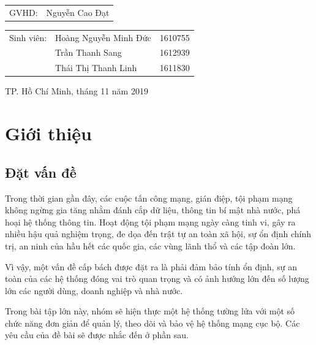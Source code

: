 \documentclass[12pt,titlepage,a4paper]{article}
\begin{document}
\begin{titlepage}
		\begin{table}[h]
			\begin{tabular}{ll}
				\hspace{2.75cm} GVHD: & Nguyễn Cao Đạt\\
			\end{tabular}
		\end{table}
		\begin{table}[h]
			\hspace{2.75cm} 
			\begin{tabular}{lll}
				Sinh viên: & Hoàng Nguyễn Minh Đức & 1610755
				\\
				 & Trần Thanh Sang & 1612939
				 \\
				 & Thái Thị Thanh Linh & 1611830
			\end{tabular}
		\end{table}
		
		\vspace{5cm}
		\begin{center}
			{\footnotesize TP. Hồ Chí Minh, tháng 11 năm 2019 }
		\end{center}
	\end{titlepage}
	
	\newpage
	\thispagestyle{empty}
	\tableofcontents
	
	\newpage
	\section{Giới thiệu}
	\subsection{Đặt vấn đề}
	Trong thời gian gần đây, các cuộc tấn công mạng, gián điệp, tội phạm mạng không ngừng gia tăng nhằm đánh cắp dữ liệu, thông tin bí mật nhà nước, phá hoại hệ thống thông tin. Hoạt động tội phạm mạng ngày càng tinh vi, gây ra nhiều hậu quả nghiệm trọng, đe dọa đến trật tự an toàn xã hội, sự ổn định chính trị, an ninh của hầu hết các quốc gia, các vùng lãnh thổ và các tập đoàn lớn.
	\par
	Vì vậy, một vấn đề cấp bách được đặt ra là phải đảm bảo tính ổn định, sự an toàn của các hệ thống đóng vai trò quan trọng và có ảnh hướng lớn đến số lượng lớn các người dùng, doanh nghiệp và nhà nước.
	\par
	Trong bài tập lớn này, nhóm sẽ hiện thực một hệ thống tường lửa với một số chức năng đơn giản để quản lý, theo dõi và bảo vệ hệ thống mạng cục bộ. Các yêu cầu của đề bài sẽ được nhắc đến ở phần sau.
	
\end{document}
